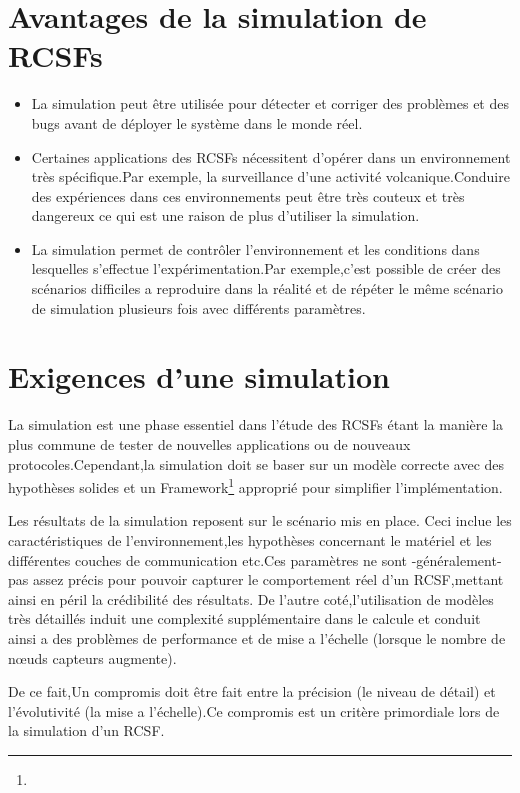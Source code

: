\section{Avantages de la simulation de RCSFs}
\begin{itemize}

\item La simulation peut être utilisée pour détecter et corriger des problèmes et des bugs avant de  déployer le système dans le monde réel.
\item Certaines applications des RCSFs nécessitent d'opérer dans un environnement très spécifique.Par exemple, la surveillance d'une activité volcanique.Conduire des expériences dans ces environnements peut être très couteux et très dangereux ce qui est une raison de plus d'utiliser la simulation.
\item La simulation permet de contrôler l'environnement et les conditions dans lesquelles s'effectue l'expérimentation.Par exemple,c'est possible de créer des scénarios difficiles a reproduire dans la réalité    et de répéter le même scénario de simulation plusieurs fois avec différents paramètres.   

\end{itemize}
\section{Exigences d'une simulation}
La simulation est une phase essentiel dans l'étude des RCSFs étant la manière la plus commune de tester de nouvelles applications ou de nouveaux protocoles.Cependant,la simulation doit se baser sur  un modèle correcte avec des hypothèses solides et un Framework\footnote{} approprié pour simplifier l'implémentation.

Les résultats de la simulation reposent sur le scénario mis en place. Ceci inclue les caractéristiques de l'environnement,les hypothèses concernant le matériel et les différentes couches de communication etc.Ces paramètres ne sont -généralement- pas assez précis  pour pouvoir capturer le comportement réel d'un RCSF,mettant ainsi en péril la crédibilité des résultats.
De l'autre coté,l'utilisation de modèles très détaillés induit une complexité supplémentaire dans le calcule et conduit ainsi a des  problèmes de performance et de mise a l'échelle (lorsque le nombre de nœuds capteurs augmente).

De ce fait,Un compromis doit être fait entre la précision (le niveau de détail) et l'évolutivité (la mise a l'échelle).Ce compromis est un critère primordiale lors de la simulation d'un RCSF.

